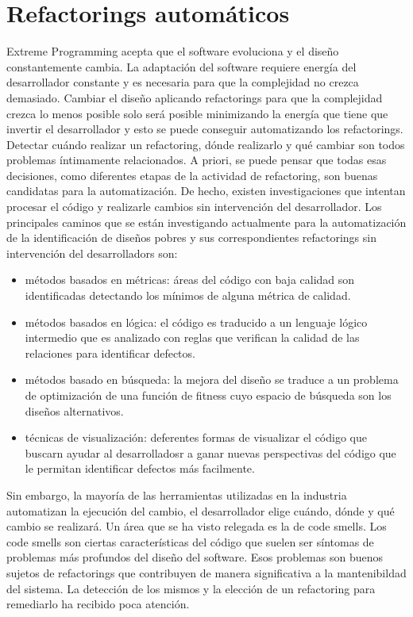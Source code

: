 \section{Refactorings automáticos}
Extreme Programming acepta que el software evoluciona y el diseño constantemente cambia. La
adaptación del software requiere energía del desarrollador constante y es necesaria para que la
complejidad no crezca demasiado. Cambiar el diseño aplicando refactorings para que la complejidad
crezca lo menos posible solo será posible minimizando la energía que tiene que invertir el
desarrollador y esto se puede conseguir automatizando los refactorings.
Detectar cuándo realizar un refactoring, dónde realizarlo y qué cambiar son todos problemas
íntimamente relacionados. A priori, se puede pensar que todas esas decisiones, como diferentes
etapas de la actividad de refactoring, son buenas candidatas para la automatización. De hecho,
existen investigaciones que intentan procesar el código y realizarle cambios sin intervención del
desarrollador. 
Los principales caminos que se están investigando actualmente para la automatización de la
identificación de diseños pobres y sus correspondientes refactorings sin intervención del
desarrolladors son:

\begin{itemize}
    \item métodos basados en métricas: áreas del código con baja calidad son identificadas detectando
    los mínimos de alguna métrica de calidad.
    \item métodos basados en lógica: el código es traducido a un lenguaje lógico intermedio que es analizado
    con reglas que verifican la calidad de las relaciones para identificar defectos.
    \item métodos basado en búsqueda: la mejora del diseño se traduce a un problema de optimización de una función de 
    fitness cuyo espacio de búsqueda son los diseños alternativos.
    \item técnicas de visualización: deferentes formas de visualizar el código que buscarn ayudar al
    desarrolladosr a ganar nuevas perspectivas del código que le permitan identificar defectos más
    facilmente.
\end{itemize}

Sin embargo, la mayoría de las herramientas utilizadas en la industria automatizan la ejecución del
cambio, el desarrollador elige cuándo, dónde y qué cambio se realizará.
Un área que se ha visto relegada es la de code smells. Los code smells son ciertas características
del código que suelen ser síntomas de problemas más profundos del diseño del software. Esos problemas
son buenos sujetos de refactorings que contribuyen de manera significativa a la mantenibildad del
sistema. La detección de los mismos y la elección de un refactoring para remediarlo ha recibido
poca atención.

